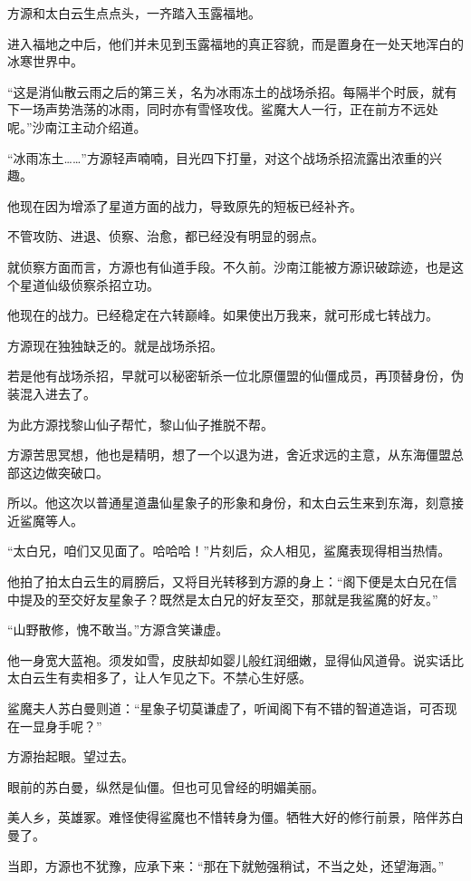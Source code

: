 \begin{this_body}
方源和太白云生点点头，一齐踏入玉露福地。

进入福地之中后，他们并未见到玉露福地的真正容貌，而是置身在一处天地浑白的冰寒世界中。

“这是消仙散云雨之后的第三关，名为冰雨冻土的战场杀招。每隔半个时辰，就有下一场声势浩荡的冰雨，同时亦有雪怪攻伐。鲨魔大人一行，正在前方不远处呢。”沙南江主动介绍道。

“冰雨冻土……”方源轻声喃喃，目光四下打量，对这个战场杀招流露出浓重的兴趣。

他现在因为增添了星道方面的战力，导致原先的短板已经补齐。

不管攻防、进退、侦察、治愈，都已经没有明显的弱点。

就侦察方面而言，方源也有仙道手段。不久前。沙南江能被方源识破踪迹，也是这个星道仙级侦察杀招立功。

他现在的战力。已经稳定在六转巅峰。如果使出万我来，就可形成七转战力。

方源现在独独缺乏的。就是战场杀招。

若是他有战场杀招，早就可以秘密斩杀一位北原僵盟的仙僵成员，再顶替身份，伪装混入进去了。

为此方源找黎山仙子帮忙，黎山仙子推脱不帮。

方源苦思冥想，他也是精明，想了一个以退为进，舍近求远的主意，从东海僵盟总部这边做突破口。

所以。他这次以普通星道蛊仙星象子的形象和身份，和太白云生来到东海，刻意接近鲨魔等人。

“太白兄，咱们又见面了。哈哈哈！”片刻后，众人相见，鲨魔表现得相当热情。

他拍了拍太白云生的肩膀后，又将目光转移到方源的身上：“阁下便是太白兄在信中提及的至交好友星象子？既然是太白兄的好友至交，那就是我鲨魔的好友。”

“山野散修，愧不敢当。”方源含笑谦虚。

他一身宽大蓝袍。须发如雪，皮肤却如婴儿般红润细嫩，显得仙风道骨。说实话比太白云生有卖相多了，让人乍见之下。不禁心生好感。

鲨魔夫人苏白曼则道：“星象子切莫谦虚了，听闻阁下有不错的智道造诣，可否现在一显身手呢？”

方源抬起眼。望过去。

眼前的苏白曼，纵然是仙僵。但也可见曾经的明媚美丽。

美人乡，英雄冢。难怪使得鲨魔也不惜转身为僵。牺牲大好的修行前景，陪伴苏白曼了。

当即，方源也不犹豫，应承下来：“那在下就勉强稍试，不当之处，还望海涵。”


\end{this_body}
